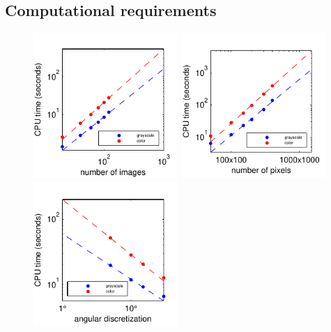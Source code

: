 \documentclass[twocolumn, 10pt]{article}
\begin{document}
\subsection*{Computational requirements}

\begin{figure}[t]
\includegraphics[width=5.5cm]{timing_studies_nimages}
%
\includegraphics[width=5.5cm]{timing_studies_npixels}
%
\includegraphics[width=5.5cm]{timing_studies_nrot}


\end{figure}
\end{document}
